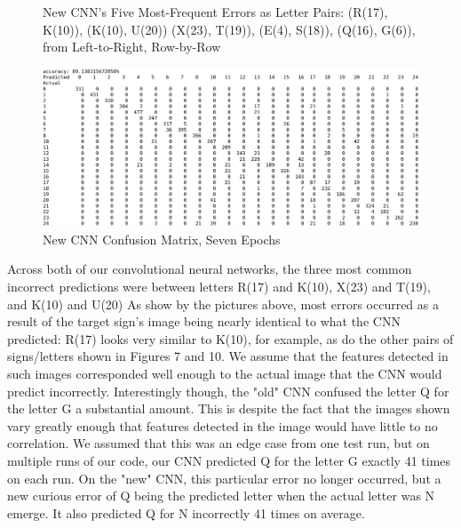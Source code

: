 \documentclass[11pt]{article}
\begin{document}
\begin{figure}[H]
\vspace{3mm}

\caption{New CNN's Five Most-Frequent Errors as Letter Pairs: (R(17), K(10)), (K(10), U(20)) (X(23), T(19)), (E(4), S(18)), (Q(16), G(6)), from Left-to-Right, Row-by-Row}
\end{figure}

\begin{figure}[H]
\begin{center}
\includegraphics[scale=0.44]{images/Extra_Confusion_Matrix_7Epochs.png}
\caption{New CNN Confusion Matrix, Seven Epochs}
\end{center}
\end{figure}

Across both of our convolutional neural networks, the three most common incorrect predictions were between letters R(17) and K(10), X(23) and T(19), and K(10) and U(20)
As show by the pictures above, most errors occurred as a result of the target sign's image being nearly identical to what the CNN predicted: R(17) looks very
similar to K(10), for example, as do the other pairs of signs/letters shown in Figures 7 and 10. We assume that the features detected in such images corresponded well enough to the actual image that the CNN would predict incorrectly. Interestingly though, the "old" CNN confused the letter Q for the letter G a substantial
amount. This is despite the fact that the images shown vary greatly enough that features detected in the image would have little to no correlation. We
assumed that this was an edge case from one test run, but on multiple runs of our code, our CNN predicted Q for the letter G exactly 41 times on each run. On
the "new" CNN, this particular error no longer occurred, but a new curious error of Q being the predicted letter when the actual letter was N emerge. It also
predicted Q for N incorrectly 41 times on average.
\end{document}
